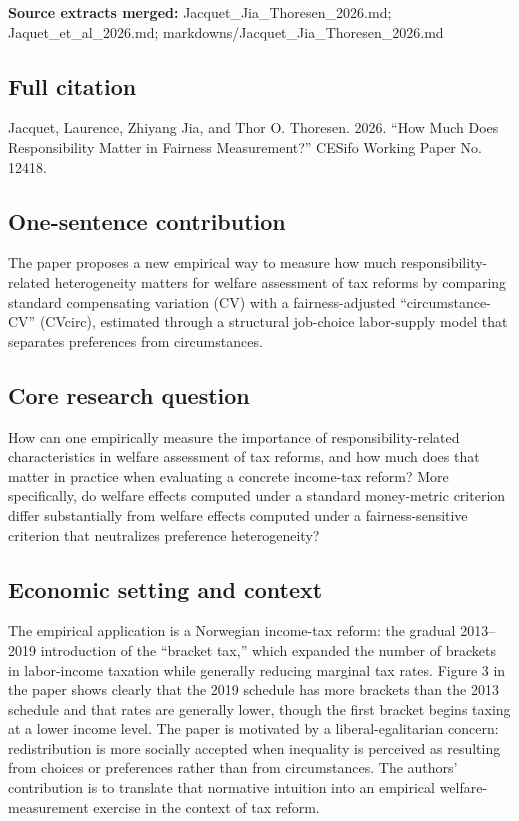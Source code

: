 \documentclass[11pt,a4paper]{article}
\begin{document}
\textbf{Source extracts merged:} Jacquet\_Jia\_Thoresen\_2026.md; Jaquet\_et\_al\_2026.md; markdowns/Jacquet\_Jia\_Thoresen\_2026.md

\subsection*{Full citation}
Jacquet, Laurence, Zhiyang Jia, and Thor O. Thoresen. 2026. “How Much Does Responsibility Matter in Fairness Measurement?” CESifo Working Paper No. 12418.

\subsection*{One-sentence contribution}
The paper proposes a new empirical way to measure how much responsibility-related heterogeneity matters for welfare assessment of tax reforms by comparing standard compensating variation (CV) with a fairness-adjusted “circumstance-CV” (CVcirc), estimated through a structural job-choice labor-supply model that separates preferences from circumstances.

\subsection*{Core research question}
How can one empirically measure the importance of responsibility-related characteristics in welfare assessment of tax reforms, and how much does that matter in practice when evaluating a concrete income-tax reform? More specifically, do welfare effects computed under a standard money-metric criterion differ substantially from welfare effects computed under a fairness-sensitive criterion that neutralizes preference heterogeneity?

\subsection*{Economic setting and context}
The empirical application is a Norwegian income-tax reform: the gradual 2013–2019 introduction of the “bracket tax,” which expanded the number of brackets in labor-income taxation while generally reducing marginal tax rates. Figure 3 in the paper shows clearly that the 2019 schedule has more brackets than the 2013 schedule and that rates are generally lower, though the first bracket begins taxing at a lower income level. The paper is motivated by a liberal-egalitarian concern: redistribution is more socially accepted when inequality is perceived as resulting from choices or preferences rather than from circumstances. The authors’ contribution is to translate that normative intuition into an empirical welfare-measurement exercise in the context of tax reform.
\end{document}
